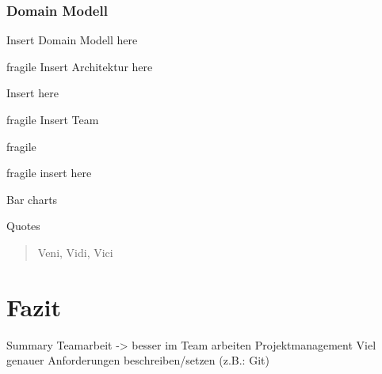 \documentclass[10pt, compress]{beamer}
\begin{document}
\begin{frame}[fragile]
  \frametitle{Domain Modell}

    Insert Domain Modell here

\end{frame}

\begin{frame}{fragile}
  Insert Architektur here
\end{frame}


\begin{frame}
    Insert here
\end{frame}


\begin{frame}{fragile}
 Insert Team
\end{frame}
\begin{frame}{fragile}

\end{frame}

\begin{frame}{fragile}
    insert here
\end{frame}


\begin{frame}{Bar charts}
  
\end{frame}
\begin{frame}{Quotes}
  \begin{quote}
    Veni, Vidi, Vici
  \end{quote}
\end{frame}

\section{Fazit}
\begin{frame}{Summary}
Teamarbeit -> besser im Team arbeiten
Projektmanagement
Viel genauer Anforderungen beschreiben/setzen (z.B.: Git)

\end{frame}

\end{document}
